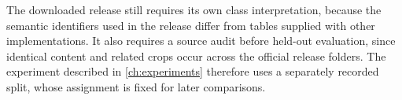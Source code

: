 The downloaded release still requires its own class interpretation, because the
semantic identifiers used in the release differ from tables supplied with other
implementations.
It also requires a source audit before held-out evaluation, since identical
content and related crops occur across the official release folders.
The experiment described in \cref{ch:experiments} therefore uses a separately
recorded split, whose assignment is fixed for later comparisons.
